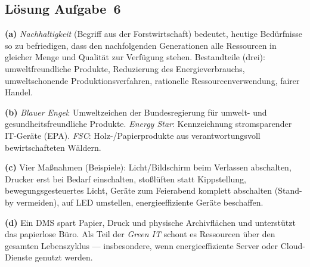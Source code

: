 \documentclass[11pt, a4paper]{article}
\begin{document}
\subsection*{Lösung Aufgabe~6}
\begin{loesung}
\textbf{(a)} \emph{Nachhaltigkeit} (Begriff aus der Forstwirtschaft) bedeutet, heutige
Bedürfnisse so zu befriedigen, dass den nachfolgenden Generationen alle Ressourcen in
gleicher Menge und Qualität zur Verfügung stehen. Bestandteile (drei): umweltfreundliche
Produkte, Reduzierung des Energieverbrauchs, umweltschonende Produktionsverfahren,
rationelle Ressourcenverwendung, fairer Handel.

\textbf{(b)} \emph{Blauer Engel}: Umweltzeichen der Bundesregierung für umwelt- und
gesundheitsfreundliche Produkte. \emph{Energy Star}: Kennzeichnung stromsparender
IT-Geräte (EPA). \emph{FSC}: Holz-/Papierprodukte aus verantwortungsvoll
bewirtschafteten Wäldern.

\textbf{(c)} Vier Maßnahmen (Beispiele): Licht/Bildschirm beim Verlassen abschalten,
Drucker erst bei Bedarf einschalten, stoßlüften statt Kippstellung, bewegungsgesteuertes
Licht, Geräte zum Feierabend komplett abschalten (Stand-by vermeiden), auf LED umstellen,
energieeffiziente Geräte beschaffen.

\textbf{(d)} Ein DMS spart Papier, Druck und physische Archivflächen und unterstützt das
papierlose Büro. Als Teil der \emph{Green IT} schont es Ressourcen über den gesamten
Lebenszyklus --- insbesondere, wenn energieeffiziente Server oder Cloud-Dienste genutzt
werden.
\end{loesung}
\end{document}
